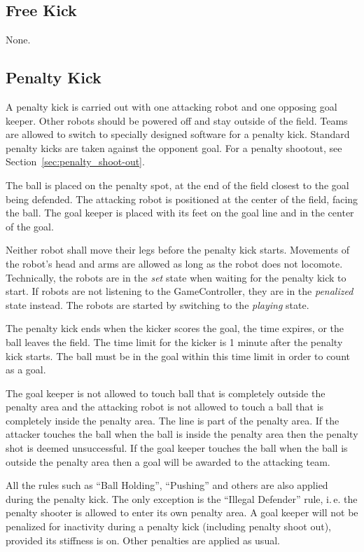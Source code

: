 \documentclass[12pt]{article}
\newcommand{\ie}{\mbox{i.\,e.}\xspace}
\begin{document}
\subsection{Free Kick}

None.

\subsection{Penalty Kick}
\label{sec:penalty_kick}

A penalty kick is carried out with one attacking robot and one opposing goal keeper. Other robots should be powered off and stay outside of the field. Teams are allowed to switch to specially designed software for a penalty kick. Standard penalty kicks are taken against the opponent goal. For a penalty shootout, see Section~\ref{sec:penalty_shoot-out}.

The ball is placed on the penalty spot, at the end of the field closest to the goal being defended. The attacking robot is positioned at the center of the field, facing the ball. The goal keeper is placed with its feet on the goal line and in the center of the goal.

Neither robot shall move their legs before the penalty kick starts. Movements of the robot's head and arms are allowed as long as the robot does not locomote. Technically, the robots are in the \emph{set} state when waiting for the penalty kick to start. If robots are not listening to the GameController, they are in the \emph{penalized} state instead. The robots are started by switching to the \emph{playing} state.

The penalty kick ends when the kicker scores the goal, the time expires, or the ball leaves the field. The time limit for the kicker is 1 minute after the penalty kick starts. The ball must be in the goal within this time limit in order to count as a goal.

The goal keeper is not allowed to touch ball that is completely outside the penalty area and the attacking robot is not allowed to touch a ball that is completely inside the penalty area. The line is part of the penalty area. If the attacker touches the ball when the ball is inside the penalty area then the penalty shot is deemed unsuccessful. If the goal keeper touches the ball when the ball is outside the penalty area then a goal will be awarded to the attacking team.

All the rules such as ``Ball Holding'', ``Pushing'' and others are also applied during the penalty kick. The only exception is the ``Illegal Defender'' rule, \ie the penalty shooter is allowed to enter its own penalty area.
A goal keeper will not be penalized for inactivity during a penalty kick (including penalty shoot out), provided its stiffness is on. Other penalties are applied as usual.
\end{document}
